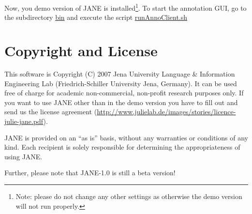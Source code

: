 \documentclass[DIV12,english,11pt,halfparskip]{scrartcl}
\begin{document}
Now, you demo version of JANE is installed\footnote{Note: please do
  not change any other settings as otherwise the demo version will not
  run properly.}. To start the annotation GUI, go to the subdirectory
\url{bin} and execute the script \url{runAnnoClient.sh}


\section{Copyright and License}

This software is Copyright (C) 2007 Jena University Language \&
Information Engineering Lab (Friedrich-Schiller University Jena,
Germany). It can be used free of charge for academic non-commercial,
non-profit research purposes only. If you want to use JANE other than
in the demo version you have to fill out and send us the license
agreement
(\url{http://www.julielab.de/images/stories/licence-julie-jane.pdf}).

JANE is provided on an ``as is'' basis, without any warranties or
conditions of any kind. Each recipient is solely responsible for
determining the appropriateness of using JANE.

Further, please note that JANE-1.0 is still a beta version!
\end{document}

